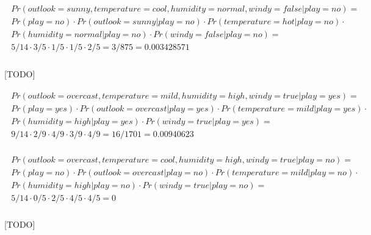 \documentclass{article}
\begin{document}
		\begin{align}
			\begin{split}
			Pr(outlook = sunny, temperature = cool, humidity = normal, windy = false | play = no) = \\
			Pr(play = no) \cdot Pr(outlook = sunny | play = no) \cdot Pr(temperature = hot 	| play = no) \cdot \\
			Pr(humidity = normal 	| play = no) \cdot Pr(windy = false | play = no) =\\
			 5/14 \cdot 3/5 \cdot 1/5 \cdot 1/5 \cdot  2/5 = 3/875 = 0.003428571
		 \end{split}
		\end{align}

		\paragraph{}
		[TODO]

		\begin{align}
			\begin{split}
				Pr(outlook = overcast, temperature = mild, humidity = high, windy = true | play = yes) = \\
				Pr(play = yes) \cdot Pr(outlook = overcast | play = yes) \cdot Pr(temperature = mild | play = yes) \cdot \\
				Pr(humidity = high 	| play = yes) \cdot Pr(windy = true 	| play = yes) = \\
				9/14 \cdot 2/9 \cdot 4/9 \cdot 3/9 \cdot 4/9 = 16/1701 = 0.00940623
			\end{split}
		\end{align}

		\begin{align}
			\begin{split}
				Pr(outlook = overcast, temperature = cool, humidity = high, windy = true | play = no) = \\
				Pr(play = no) \cdot Pr(outlook = overcast | play = no) \cdot Pr(temperature = mild | play = no) \cdot \\
				Pr(humidity = high 	| play = no) \cdot Pr(windy = true | play = no) =\\
				5/14 \cdot 0/5 \cdot 2/5 \cdot 4/5 \cdot  4/5 = 0
			\end{split}
		\end{align}

		\paragraph{}
		[TODO]
\end{document}

